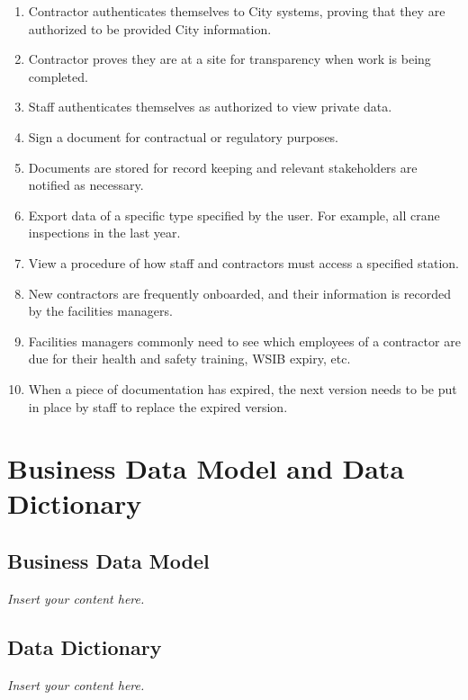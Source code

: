 \documentclass[12pt]{article}
\newcommand{\lips}{\textit{Insert your content here.}}
\begin{document}
\begin{enumerate}
  \item Contractor authenticates themselves to City systems, proving that they
    are authorized to be provided City information.\\
  \item Contractor proves they are at a site for transparency when work is being
    completed.\\
  \item Staff authenticates themselves as authorized to view private data.\\
  \item Sign a document for contractual or regulatory purposes.\\
  \item Documents are stored for record keeping and relevant stakeholders
    are notified as necessary.\\
  \item Export data of a specific type specified by the user. For example, all
    crane inspections in the last year.\\
  \item View a procedure of how staff and contractors must access a specified
    station.\\
  \item New contractors are frequently onboarded, and their information is
    recorded by the facilities managers.\\
  \item Facilities managers commonly need to see which employees of a contractor
    are due for their health and safety training, WSIB expiry, etc.\\
  \item When a piece of documentation has expired, the next version needs to be
    put in place by staff to replace the expired version.\\
\end{enumerate}

\section{Business Data Model and Data Dictionary}
\subsection{Business Data Model}
\lips
\subsection{Data Dictionary}
\lips
\end{document}

